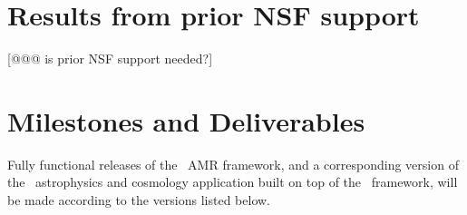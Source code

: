 \documentclass[11pt,letterpaper]{article}
\begin{document}
\section{Results from prior NSF support} \label{s:prior-support}

[@@@ is prior NSF support needed?]


\section{Milestones and Deliverables} \label{s:milestones}

Fully functional releases of the \cello\ AMR framework, and a
corresponding version of the \enzoii\ astrophysics and cosmology
application built on top of the \cello\ framework, will be made
according to the versions listed below.

   
\end{document}
